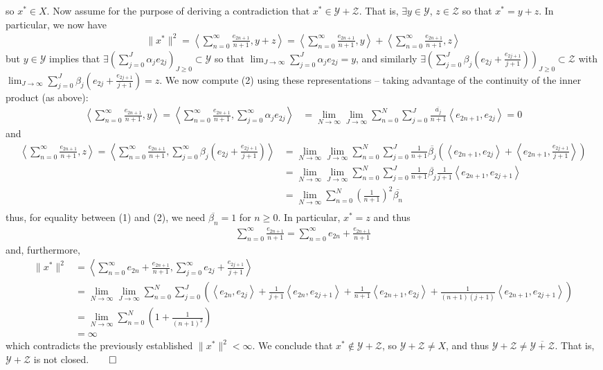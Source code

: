 \documentclass[10pt]{article}
\newcommand{\1}[1]{\mathbbm{1}_{#1}} \newcommand{\mc}[1]{\mathcal{#1}}
\newcommand{\ip}[2]{\left\langle#1,#2\right\rangle }
\begin{document}
    so $x^\ast\in X$. Now assume for the purpose of deriving a contradiction that $x^\ast\in\mc{Y}+\mc{Z}$. That is, $\exists y\in\mc{Y}$, $z\in\mc{Z}$ so that $x^\ast=y+z$. In particular, we now have
    \begin{align*}
        \|x^\ast\|^2=\ip{\sum_{n=0}^\infty\frac{e_{2n+1}}{n+1}}{y+z}=\ip{\sum_{n=0}^\infty\frac{e_{2n+1}}{n+1}}{y}+\ip{\sum_{n=0}^\infty\frac{e_{2n+1}}{n+1}}{z}\tag{2}
    \end{align*}
    but $y\in\mc{Y}$ implies that $\exists\left(\sum_{j=0}^J\alpha_je_{2j}\right)_{J\geq 0}\subset\mc{Y}$ so that $\lim_{J\rightarrow\infty}\sum_{j=0}^J\alpha_je_{2j}=y$, and similarly $\exists\left(\sum_{j=0}^J\beta_j(e_{2j}+\frac{e_{2j+1}}{j+1})\right)_{J\geq 0}\subset\mc{Z}$ with $\lim_{J\rightarrow\infty}\sum_{j=0}^J\beta_j(e_{2j}+\frac{e_{2j+1}}{j+1})=z$. We now compute
    (2) using these representations -- taking advantage of the continuity of the inner product (as above):
    \begin{align*}
        \ip{\sum_{n=0}^\infty\frac{e_{2n+1}}{n+1}}{y}=\ip{\sum_{n=0}^\infty\frac{e_{2n+1}}{n+1}}{\sum_{j=0}^\infty\alpha_je_{2j}}&=\lim_{N\rightarrow\infty}\lim_{J\rightarrow\infty}\sum_{n=0}^N\sum_{j=0}^J\frac{\overline{a_j}}{n+1}\ip{e_{2n+1}}{e_{2j}}=0
    \end{align*}
    and
    \begin{align*}
        \ip{\sum_{n=0}^\infty\frac{e_{2n+1}}{n+1}}{z}=\ip{\sum_{n=0}^\infty\frac{e_{2n+1}}{n+1}}{\sum_{j=0}^\infty\beta_j(e_{2j}+\frac{e_{2j+1}}{j+1})}&=\lim_{N\rightarrow\infty}\lim_{J\rightarrow\infty}\sum_{n=0}^N\sum_{j=0}^J\frac{1}{n+1}\overline{\beta_j}\left(\ip{e_{2n+1}}{e_{2j}}+\ip{e_{2n+1}}{\frac{e_{2j+1}}{j+1}}\right)\\
        &=\lim_{N\rightarrow\infty}\lim_{J\rightarrow\infty}\sum_{n=0}^N\sum_{j=0}^J\frac{1}{n+1}\overline{\beta_j}\frac{1}{j+1}\ip{e_{2n+1}}{e_{2j+1}}\\
        &=\lim_{N\rightarrow\infty}\sum_{n=0}^N\left(\frac{1}{n+1}\right)^2\overline{\beta_n}\\
    \end{align*}
    thus, for equality between (1) and (2), we need $\overline{\beta_n}=1$ for $n\geq 0$. In particular, $x^\ast=z$ and thus
    \begin{align*}
        \sum_{n=0}^\infty\frac{e_{2n+1}}{n+1}=\sum_{n=0}^\infty e_{2n}+\frac{e_{2n+1}}{n+1}
    \end{align*}
    and, furthermore,
    \begin{align*}
        \|x^\ast\|^2&=\ip{\sum_{n=0}^\infty e_{2n}+\frac{e_{2n+1}}{n+1}}{\sum_{j=0}^\infty e_{2j}+\frac{e_{2j+1}}{j+1}}\\
        &=\lim_{N\rightarrow\infty}\lim_{J\rightarrow\infty}\sum_{n=0}^N\sum_{j=0}^J\left(\ip{e_{2n}}{e_{2j}}+\frac{1}{j+1}\ip{e_{2n}}{e_{2j+1}}+\frac{1}{n+1}\ip{e_{2n+1}}{e_{2j}}+\frac{1}{(n+1)(j+1)}\ip{e_{2n+1}}{e_{2j+1}}\right)\\
        &=\lim_{N\rightarrow\infty}\sum_{n=0}^N\left(1+\frac{1}{(n+1)^2}\right)\\
        &=\infty
    \end{align*}
    which contradicts the previously established $\|x^\ast\|^2<\infty$. We conclude that $x^\ast\notin\mc{Y}+\mc{Z}$, so $\mc{Y}+\mc{Z}\neq X$, and thus $\mc{Y}+\mc{Z}\neq \overline{\mc{Y}+\mc{Z}}$. That is, $\mc{Y}+\mc{Z}$ is not closed.\hfill{$\qed$}\\[5pt]
\end{document}
